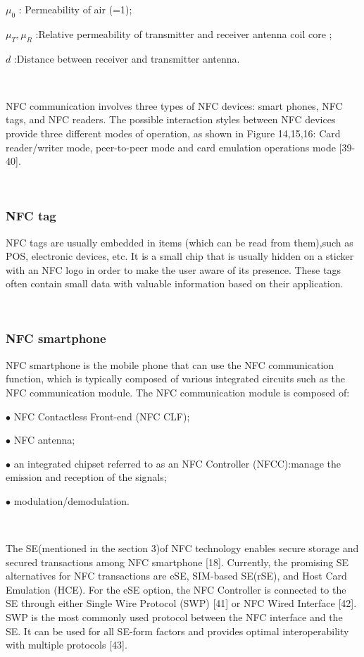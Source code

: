 \documentclass[journal]{IEEEtran}
\begin{document}
$\mu_{0}$                          :  Permeability of air (=1);
           
$\mu_{T},\mu_{R}$                        :Relative permeability of transmitter and receiver antenna coil core ;
           
$d$           :Distance between receiver and transmitter antenna.





\
\




NFC communication involves three types of NFC devices: smart phones, NFC tags, and NFC readers. The possible interaction styles between NFC devices provide three different modes of operation, as shown in Figure 14,15,16: Card reader/writer mode, peer-to-peer mode and card emulation operations mode [39-40].

\

\subsubsection{NFC tag}
NFC tags are usually embedded in items (which can be read from them),such as POS, electronic devices, etc. It is a small chip that is usually hidden on a sticker with an NFC logo in order to make the user aware of its presence. These tags often contain small data with valuable information based on their application.

\

\subsubsection{NFC smartphone}
NFC smartphone is the mobile phone that can use the NFC communication function, which is typically composed of various integrated circuits such as the NFC communication module. The NFC communication module is composed of:

$\bullet$ NFC Contactless Front-end (NFC CLF);

$\bullet$ NFC antenna;

$\bullet$ an integrated chipset referred to as an NFC Controller (NFCC):manage the emission and reception of the signals;


$\bullet$ modulation/demodulation.

\



The SE(mentioned in the section 3)of NFC technology enables secure storage and secured transactions among NFC smartphone [18]. Currently, the promising SE alternatives for NFC transactions are eSE, SIM-based SE(rSE), and Host Card Emulation (HCE). For the eSE option, the NFC Controller is connected to the SE through either Single Wire Protocol (SWP) [41] or NFC Wired Interface  [42]. SWP is the most commonly used protocol between the NFC interface and the SE. It can be used for all SE-form factors and provides optimal interoperability with multiple protocols [43].
\end{document}

